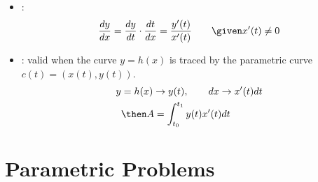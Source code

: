 \begin{itemize}
  \item {}:
    \[%
      \frac{dy}{dx}  = \frac{dy}{dt} \cdot \frac{dt}{dx} = \frac{y'(t)}{x'(t)}
      \qquad \given x'(t) \neq 0
    \]%

  \item {}: valid when the curve \(y = h(x)\)
    is traced  by the parametric curve \(c(t) = (x(t), y(t))\).
    \begin{align*}
      y &= h(x) \to y(t), \qquad  dx \to x'(t) dt \\
      &\then A = \int_{t_0}^{t_1}  y(t)x'(t) dt
    \end{align*}


\end{itemize}

\section{Parametric Problems}
